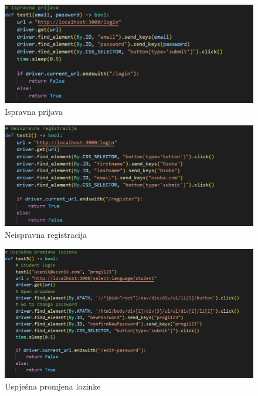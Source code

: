 \begin{figure}[htp]
    \includegraphics[scale=0.5]{dijagrami/test1.png}
    \centering
    \caption{Ispravna prijava}
    \label{fig:sys-1}
\end{figure}

\begin{figure}[htp]
    \includegraphics[scale=0.5]{dijagrami/test2.png}
    \centering
    \caption{Neispravna registracija}
    \label{fig:sys-2}
\end{figure}

\begin{figure}[htp]    
    \includegraphics[scale=0.5]{dijagrami/test3.png}
    \centering
    \caption{Uspješna promjena lozinke}
    \label{fig:sys-3}
\end{figure}

